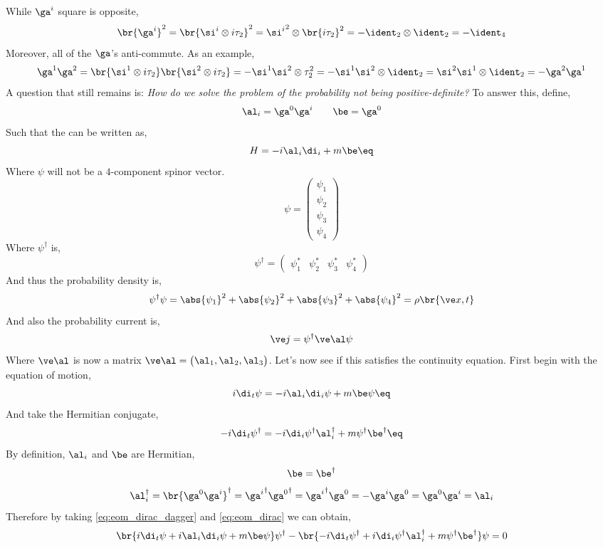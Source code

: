 \documentclass{article}
\begin{document}
While $\ga^{i}$ square is opposite,
\[ \br{\ga^{i}}^2 = \br{\si^{i} \otimes i \tau_{2}}^2 = {\si^{i}}^2 \otimes \br{i\tau_{2}}^2 = - \ident_{2} \otimes \ident_{2} = - \ident_{4}\]
Moreover, all of the $\ga$'s anti-commute. As an example,
\[ \ga^{1} \ga^{2} = \br{\si^{1} \otimes i \tau_{2}} \br{\si^{2} \otimes i \tau_{2}} = - \si^{1}\si^{2} \otimes \tau_{2}^2 = - \si^{1}\si^{2} \otimes \ident_{2} = \si^{2}\si^{1} \otimes \ident_{2} = -\ga^{2} \ga^{1} \]
A question that still remains is: \textit{How do we solve the problem of the probability not being positive-definite?} To answer this, define,
\[ \al_i = \ga^{0} \ga^{i} \qquad \be = \ga^{0} \]
Such that the  can be written as,
\[ H = - i \al_i \di_i + m \be \eq \label{eq:dirac_Hamiltonian} \]
Where $\psi$ will not be a $4$-component spinor vector.
\[ \psi = \begin{pmatrix}
    \psi_1 \\ \psi_2 \\ \psi_3 \\ \psi_4
\end{pmatrix} \]
Where $\psi^{\dagger}$ is,
\[ \psi^{\dagger} = \begin{pmatrix}
    \psi_1^* & \psi_2^* & \psi_3^* & \psi_4^*
\end{pmatrix} \]
And thus the probability density is,
\[ \psi^{\dagger} \psi = \abs{\psi_1}^2 + \abs{\psi_2}^2 + \abs{\psi_3}^2 + \abs{\psi_4}^2 = \rho\br{\ve x, t} \]
And also the probability current is,
\[ \ve j = \psi^{\dagger} \ve \al \psi \]
Where $\ve \al$ is now a matrix $\ve \al = \begin{pmatrix} \al_1, \al_2, \al_3 \end{pmatrix}$. Let's now see if this satisfies the continuity equation. First begin with the equation of motion,
\[ i \di_t \psi = - i \al_i \di_i \psi + m \be \psi \eq \label{eq:eom_dirac}\]
And take the Hermitian conjugate,
\[ - i \di_t \psi^{\dagger} = - i \di_i \psi^{\dagger} \al_i^{\dagger}  + m \psi^{\dagger} \be^{\dagger} \eq \label{eq:eom_dirac_dagger} \]
By definition, $\al_i$ and $\be$ are Hermitian,
\[ \be = \be^{\dagger} \]
\[ \al_i^{\dagger} = \br{\ga^{0} \ga^{i}}^{\dagger} = {\ga^{i}}^{\dagger} {\ga^{0}}^{\dagger} = {\ga^{i}}^{\dagger} \ga^{0} = - \ga^{i} \ga^{0} = \ga^{0} \ga^{i} = \al_i \]
Therefore by taking \cref{eq:eom_dirac_dagger} and \cref{eq:eom_dirac} we can obtain,
\[ \br{i \di_t \psi + i \al_i \di_i \psi + m \be \psi} \psi^{\dagger} - \br{- i \di_t \psi^{\dagger} + i \di_i \psi^{\dagger} \al_i^{\dagger}  + m \psi^{\dagger} \be^{\dagger}} \psi  = 0 \]
\end{document}
